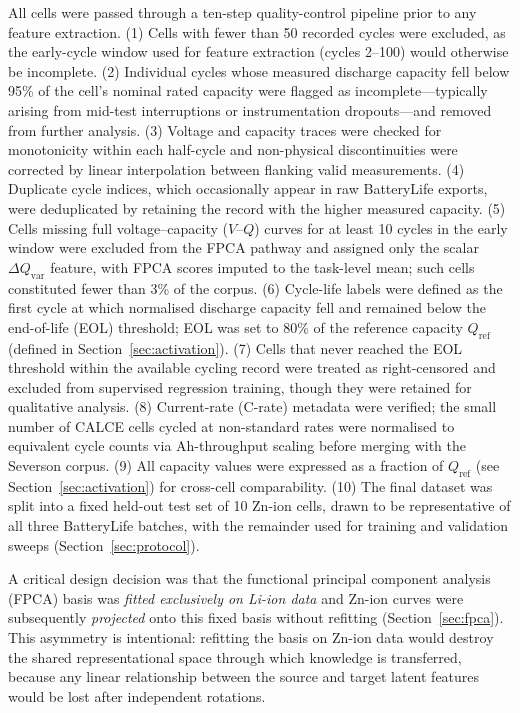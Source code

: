 All cells were passed through a ten-step quality-control pipeline prior to
any feature extraction.
(1) Cells with fewer than 50 recorded cycles were excluded, as the early-cycle
window used for feature extraction (cycles 2--100) would otherwise be
incomplete.
(2) Individual cycles whose measured discharge capacity fell below 95\% of the
cell's nominal rated capacity were flagged as incomplete---typically arising
from mid-test interruptions or instrumentation dropouts---and removed from
further analysis.
(3) Voltage and capacity traces were checked for monotonicity within each
half-cycle and non-physical discontinuities were corrected by linear
interpolation between flanking valid measurements.
(4) Duplicate cycle indices, which occasionally appear in raw BatteryLife
exports, were deduplicated by retaining the record with the higher measured
capacity.
(5) Cells missing full voltage--capacity ($V$--$Q$) curves for at least 10
cycles in the early window were excluded from the FPCA pathway and assigned
only the scalar $\Delta Q_{\mathrm{var}}$ feature, with FPCA scores imputed
to the task-level mean; such cells constituted fewer than 3\% of the corpus.
(6) Cycle-life labels were defined as the first cycle at which normalised
discharge capacity fell and remained below the end-of-life (EOL) threshold;
EOL was set to 80\% of the reference capacity $Q_{\mathrm{ref}}$ (defined in
Section~\ref{sec:activation}).
(7) Cells that never reached the EOL threshold within the available cycling
record were treated as right-censored and excluded from supervised regression
training, though they were retained for qualitative analysis.
(8) Current-rate (C-rate) metadata were verified; the small number of CALCE
cells cycled at non-standard rates were normalised to equivalent cycle
counts via Ah-throughput scaling before merging with the Severson corpus.
(9) All capacity values were expressed as a fraction of $Q_{\mathrm{ref}}$
(see Section~\ref{sec:activation}) for cross-cell comparability.
(10) The final dataset was split into a fixed held-out test set of 10 Zn-ion
cells, drawn to be representative of all three BatteryLife batches, with the
remainder used for training and validation sweeps (Section~\ref{sec:protocol}).

A critical design decision was that the functional principal component
analysis (FPCA) basis was \emph{fitted exclusively on Li-ion data} and
Zn-ion curves were subsequently \emph{projected} onto this fixed basis
without refitting (Section~\ref{sec:fpca}).  This asymmetry is intentional:
refitting the basis on Zn-ion data would destroy the shared representational
space through which knowledge is transferred, because any linear relationship
between the source and target latent features would be lost after independent
rotations.

